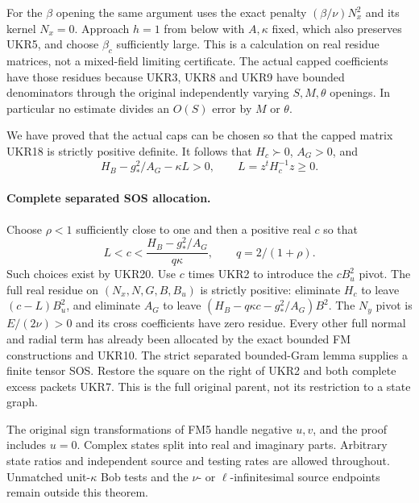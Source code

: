 For the $\beta$ opening the same argument uses the exact penalty
$(\beta/\nu)N_x^2$ and its kernel $N_x=0$. Approach $h=1$ from
below with $A,\kappa$ fixed, which also preserves UKR5, and choose
$\beta_c$ sufficiently large. This is a calculation on real
residue matrices, not a mixed-field limiting certificate. The
actual capped coefficients have those residues because UKR3,
UKR8 and UKR9 have bounded denominators through the original
independently varying $S,M,\theta$ openings. In particular no
estimate divides an $O(S)$ error by $M$ or $\theta$.

We have proved that the actual caps can be chosen so that the
capped matrix UKR18 is strictly positive definite. It follows
that $H_c\succ0$, $A_G>0$, and
\[
 H_B-g_*^2/A_G-\kappa L>0,\qquad L=z^tH_c^{-1}z\ge0.
 \tag{UKR20}
\]

\paragraph{Complete separated SOS allocation.}
Choose $\rho<1$ sufficiently close to one and then a positive
real $c$ so that
\[
 L<c<\frac{H_B-g_*^2/A_G}{q\kappa},\qquad q=2/(1+\rho).
 \tag{UKR21}
\]
Such choices exist by UKR20. Use $c$ times UKR2 to introduce
the $cB_u^2$ pivot. The full real residue on
$(N_x,N,G,B,B_u)$ is strictly positive: eliminate $H_c$ to
leave $(c-L)B_u^2$, and eliminate $A_G$ to leave
$(H_B-q\kappa c-g_*^2/A_G)B^2$.
The $N_y$ pivot is $E/(2\nu)>0$ and its cross coefficients
have zero residue. Every other full normal and radial term has
already been allocated by the exact bounded FM constructions
and UKR10. The strict separated bounded-Gram lemma supplies a
finite tensor SOS. Restore the square on the right of UKR2 and
both complete excess packets UKR7. This is the full original
parent, not its restriction to a state graph.

The original sign transformations of FM5 handle negative $u,v$,
and the proof includes $u=0$. Complex states split into real and
imaginary parts. Arbitrary state ratios and independent source
and testing rates are allowed throughout. Unmatched unit-$\kappa$
Bob tests and the $\nu$- or $\ell$-infinitesimal source endpoints
remain outside this theorem.
